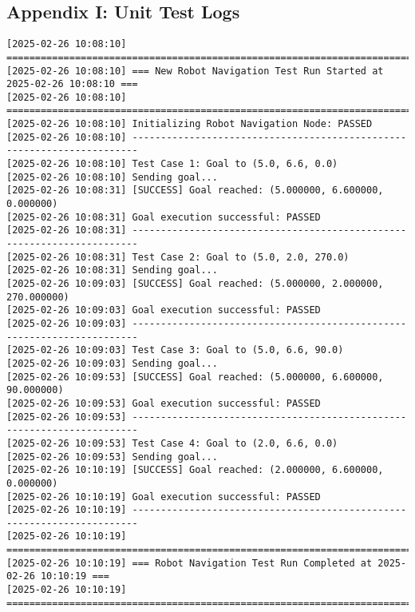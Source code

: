 \documentclass{CSSRforAfrica}
\begin{document}
\begin{landscape} 
\section*{Appendix I: Unit Test Logs}

\small  
\begin{verbatim}
[2025-02-26 10:08:10] =======================================================================
[2025-02-26 10:08:10] === New Robot Navigation Test Run Started at 2025-02-26 10:08:10 ===
[2025-02-26 10:08:10] =======================================================================
[2025-02-26 10:08:10] Initializing Robot Navigation Node: PASSED
[2025-02-26 10:08:10] -----------------------------------------------------------------------
[2025-02-26 10:08:10] Test Case 1: Goal to (5.0, 6.6, 0.0)
[2025-02-26 10:08:10] Sending goal...
[2025-02-26 10:08:31] [SUCCESS] Goal reached: (5.000000, 6.600000, 0.000000)
[2025-02-26 10:08:31] Goal execution successful: PASSED
[2025-02-26 10:08:31] -----------------------------------------------------------------------
[2025-02-26 10:08:31] Test Case 2: Goal to (5.0, 2.0, 270.0)
[2025-02-26 10:08:31] Sending goal...
[2025-02-26 10:09:03] [SUCCESS] Goal reached: (5.000000, 2.000000, 270.000000)
[2025-02-26 10:09:03] Goal execution successful: PASSED
[2025-02-26 10:09:03] -----------------------------------------------------------------------
[2025-02-26 10:09:03] Test Case 3: Goal to (5.0, 6.6, 90.0)
[2025-02-26 10:09:03] Sending goal...
[2025-02-26 10:09:53] [SUCCESS] Goal reached: (5.000000, 6.600000, 90.000000)
[2025-02-26 10:09:53] Goal execution successful: PASSED
[2025-02-26 10:09:53] -----------------------------------------------------------------------
[2025-02-26 10:09:53] Test Case 4: Goal to (2.0, 6.6, 0.0)
[2025-02-26 10:09:53] Sending goal...
[2025-02-26 10:10:19] [SUCCESS] Goal reached: (2.000000, 6.600000, 0.000000)
[2025-02-26 10:10:19] Goal execution successful: PASSED
[2025-02-26 10:10:19] -----------------------------------------------------------------------
[2025-02-26 10:10:19] =======================================================================
[2025-02-26 10:10:19] === Robot Navigation Test Run Completed at 2025-02-26 10:10:19 ===
[2025-02-26 10:10:19] =======================================================================


\end{verbatim}
\end{landscape}
\end{document}
